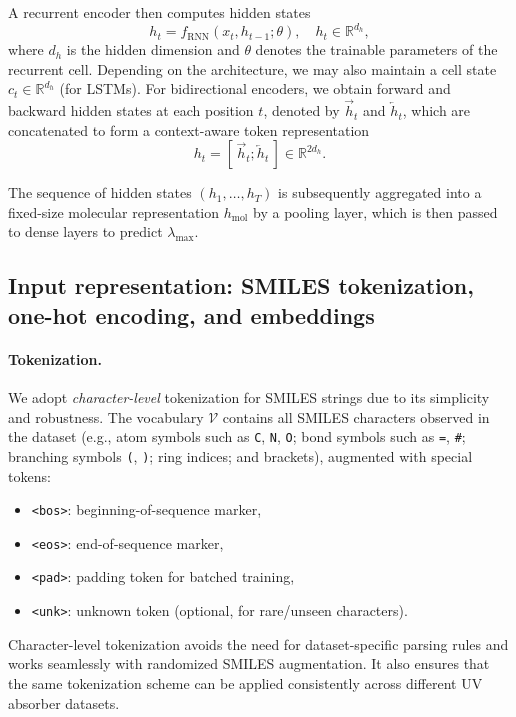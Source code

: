 \documentclass[11pt,a4paper]{article}
\begin{document}
A recurrent encoder then computes hidden states
\begin{equation}
  h_t = f_{\mathrm{RNN}}(x_t, h_{t-1}; \theta), \quad h_t \in \mathbb{R}^{d_h},
\end{equation}
where $d_h$ is the hidden dimension and $\theta$ denotes the trainable parameters of the recurrent cell. Depending on the architecture, we may also maintain a cell state $c_t \in \mathbb{R}^{d_h}$ (for LSTMs). For bidirectional encoders, we obtain forward and backward hidden states at each position $t$, denoted by $\overrightarrow{h}_t$ and $\overleftarrow{h}_t$, which are concatenated to form a context-aware token representation
\begin{equation}
  h_t = [\,\overrightarrow{h}_t; \overleftarrow{h}_t\,] \in \mathbb{R}^{2d_h}.
\end{equation}

The sequence of hidden states $(h_1, \dots, h_T)$ is subsequently aggregated into a fixed-size molecular representation $h_{\mathrm{mol}}$ by a pooling layer, which is then passed to dense layers to predict $\lambda_{\max}$.

\subsection{Input representation: SMILES tokenization, one-hot encoding, and embeddings}
\label{subsec:input_representation}

\paragraph{Tokenization.}
We adopt \emph{character-level} tokenization for SMILES strings due to its simplicity and robustness. The vocabulary $\mathcal{V}$ contains all SMILES characters observed in the dataset (e.g., atom symbols such as \texttt{C}, \texttt{N}, \texttt{O}; bond symbols such as \texttt{=}, \texttt{\#}; branching symbols \texttt{(}, \texttt{)}; ring indices; and brackets), augmented with special tokens:
\begin{itemize}
  \item \verb|<bos>|: beginning-of-sequence marker,
  \item \verb|<eos>|: end-of-sequence marker,
  \item \verb|<pad>|: padding token for batched training,
  \item \verb|<unk>|: unknown token (optional, for rare/unseen characters).
\end{itemize}
Character-level tokenization avoids the need for dataset-specific parsing rules and works seamlessly with randomized SMILES augmentation. It also ensures that the same tokenization scheme can be applied consistently across different UV absorber datasets.
\end{document}
